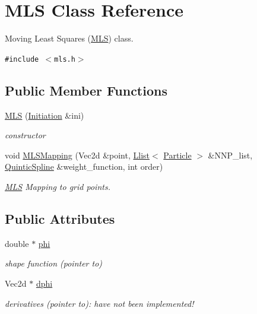 \hypertarget{classMLS}{
\section{MLS Class Reference}
\label{classMLS}
}
Moving Least Squares (\hyperlink{classMLS}{MLS}) class.  


{\tt \#include $<$mls.h$>$}

\subsection*{Public Member Functions}
\begin{CompactItemize}
\item 
\hyperlink{classMLS_69c81b7b81631bb306259deaf925cac3}{MLS} (\hyperlink{classInitiation}{Initiation} \&ini)
\begin{CompactList}\small\item\em constructor \item\end{CompactList}\item 
void \hyperlink{classMLS_70f00e273459e8fe02baa5a0c06d6f24}{MLSMapping} (Vec2d \&point, \hyperlink{classLlist}{Llist}$<$ \hyperlink{classParticle}{Particle} $>$ \&NNP\_\-list, \hyperlink{classQuinticSpline}{QuinticSpline} \&weight\_\-function, int order)
\begin{CompactList}\small\item\em \hyperlink{classMLS}{MLS} Mapping to grid points. \item\end{CompactList}\end{CompactItemize}
\subsection*{Public Attributes}
\begin{CompactItemize}
\item 
\hypertarget{classMLS_8e02a81746ff6002015a7325b871282c}{
double $\ast$ \hyperlink{classMLS_8e02a81746ff6002015a7325b871282c}{phi}}
\label{classMLS_8e02a81746ff6002015a7325b871282c}

\begin{CompactList}\small\item\em shape function (pointer to) \item\end{CompactList}\item 
\hypertarget{classMLS_328f8049ce8b237bdc42f89a8b5dde07}{
Vec2d $\ast$ \hyperlink{classMLS_328f8049ce8b237bdc42f89a8b5dde07}{dphi}}
\label{classMLS_328f8049ce8b237bdc42f89a8b5dde07}

\begin{CompactList}\small\item\em derivatives (pointer to): have not been implemented! \item\end{CompactList}\end{CompactItemize}
